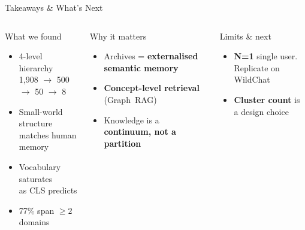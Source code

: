 \documentclass[aspectratio=169, 12pt]{beamer}
\begin{document}
\begin{frame}{Takeaways \& What's Next}
    \begin{columns}[T]
        \begin{exampleblock}{What we found}
            \footnotesize
            \begin{itemize}\setlength\itemsep{0.25em}
                \item 4-level hierarchy\\ 1{,}908 $\to$ 500 $\to$ 50 $\to$ 8
                \item Small-world structure\\ matches human memory
                \item Vocabulary saturates\\ as CLS predicts
                \item 77\% span $\geq 2$ domains
            \end{itemize}
        \end{exampleblock}

        \begin{block}{Why it matters}
            \small
            \begin{itemize}\setlength\itemsep{0.35em}
                \item Archives = \textbf{externalised semantic memory}
                \item \textbf{Concept-level retrieval} (Graph~RAG)
                \item Knowledge is a \textbf{continuum, not a partition}
            \end{itemize}
        \end{block}

        \begin{alertblock}{Limits \& next}
            \footnotesize
            \begin{itemize}\setlength\itemsep{0.25em}
                \item \textbf{N=1} single user.\\ Replicate on WildChat
                \item \textbf{Cluster count} is a design choice
            \end{itemize}
        \end{alertblock}
    \end{columns}


\end{frame}
\end{document}
